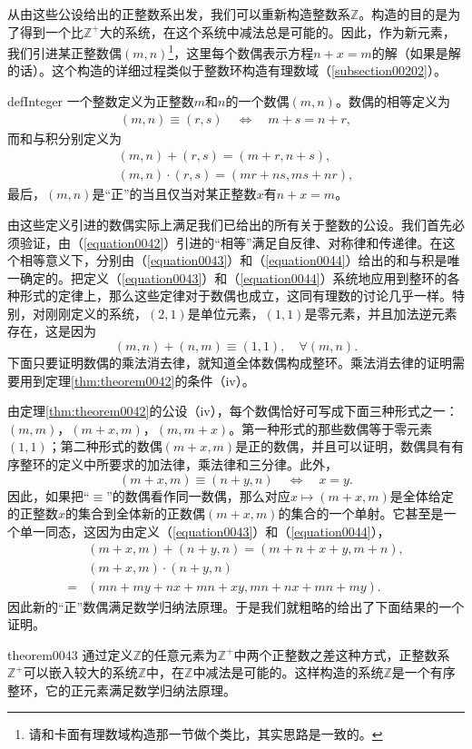 从由这些公设给出的正整数系出发，我们可以重新构造整数系$\mathbb{Z}$。构造的目的是为了得到一个比$\mathbb{Z}^+$大的系统，在这个系统中减法总是可能的。因此，作为新元素，我们引进某正整数偶$(m,n)$\footnote{请和卡面有理数域构造那一节做个类比，其实思路是一致的。}，这里每个数偶表示方程$n+x=m$的解（如果是解的话）。这个构造的详细过程类似于整数环构造有理数域（\ref{subsection00202}）。
\begin{definition}{}{defInteger}
一个整数定义为正整数$m$和$n$的一个数偶$(m,n)$。数偶的相等定义为
\begin{gather}\label{equation0042}
(m,n)\equiv(r,s) \quad\Leftrightarrow\quad m+s = n+ r,
\end{gather}
而和与积分别定义为
\begin{gather}
(m,n)+(r, s) = (m+r, n+s), \label{equation0043}\\
(m,n)\cdot(r,s)=(mr+ns, ms+nr),\label{equation0044}
\end{gather}
最后，$(m,n)$是“正”的当且仅当对某正整数$x$有$n+x=m$。
\end{definition}

由这些定义引进的数偶实际上满足我们已给出的所有关于整数的公设。我们首先必须验证，由（\ref{equation0042}）引进的“相等”满足自反律、对称律和传递律。在这个相等意义下，分别由（\ref{equation0043}）和（\ref{equation0044}）给出的和与积是唯一确定的。把定义（\ref{equation0043}）和（\ref{equation0044}）系统地应用到整环的各种形式的定律上，那么这些定律对于数偶也成立，这同有理数的讨论几乎一样。特别，对刚刚定义的系统，$(2,1)$是单位元素，$(1,1)$是零元素，并且加法逆元素存在，这是因为
\[
(m,n)+(n,m) \equiv (1,1),\quad \forall (m,n).
\]
下面只要证明数偶的乘法消去律，就知道全体数偶构成整环。乘法消去律的证明需要用到定理\ref{thm:theorem0042}的条件（iv）。

由定理\ref{thm:theorem0042}的公设（iv），每个数偶恰好可写成下面三种形式之一：$(m,m)$，$(m+x, m)$，$(m, m+x)$。第一种形式的那些数偶等于零元素$(1,1)$；第二种形式的数偶$(m+x,m)$是正的数偶，并且可以证明，数偶具有有序整环的定义中所要求的加法律，乘法律和三分律。此外，
\[
(m+x, m) \equiv (n+y,n) \quad\Leftrightarrow\quad x=y.
\] 
因此，如果把“$\equiv$”的数偶看作同一数偶，那么对应$x \mapsto (m+x,m)$是全体给定的正整数$x$的集合到全体新的正数偶$(m+x, m)$的集合的一个单射。它甚至是一个单一同态，这因为由定义（\ref{equation0043}）和（\ref{equation0044}），
\[
\begin{aligned}
&(m+x, m) + (n+y, n) = (m+n+x+y,m+n),\\
&(m+x, m)\cdot(n+y, n)\\
=&(mn+my+nx+mn+xy, mn+nx+mn+my).
\end{aligned}
\]
因此新的“正”数偶满足数学归纳法原理。于是我们就粗略的给出了下面结果的一个证明。
\begin{theorem}{}{theorem0043}
通过定义$\mathbb{Z}$的任意元素为$\mathbb{Z}^+$中两个正整数之差这种方式，正整数系$\mathbb{Z}^+$可以嵌入较大的系统$\mathbb{Z}$中，在$\mathbb{Z}$中减法是可能的。这样构造的系统$\mathbb{Z}$是一个有序整环，它的正元素满足数学归纳法原理。
\end{theorem}

